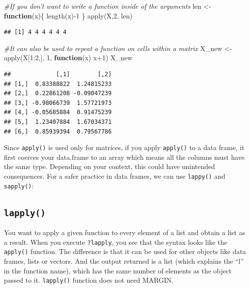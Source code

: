 \documentclass[
]{book}
\newenvironment{Shaded}{\begin{snugshade}}{\end{snugshade}}
\newcommand{\CommentTok}[1]{\textcolor[rgb]{0.56,0.35,0.01}{\textit{#1}}}
\newcommand{\ControlFlowTok}[1]{\textcolor[rgb]{0.13,0.29,0.53}{\textbf{#1}}}
\newcommand{\DecValTok}[1]{\textcolor[rgb]{0.00,0.00,0.81}{#1}}
\newcommand{\FunctionTok}[1]{\textcolor[rgb]{0.00,0.00,0.00}{#1}}
\newcommand{\NormalTok}[1]{#1}
\newcommand{\OtherTok}[1]{\textcolor[rgb]{0.56,0.35,0.01}{#1}}
\newcommand{\SpecialCharTok}[1]{\textcolor[rgb]{0.00,0.00,0.00}{#1}}
\theoremstyle{definition}
\theoremstyle{definition}
\theoremstyle{definition}
\theoremstyle{definition}
\theoremstyle{remark}
\begin{document}
\begin{Shaded}
\begin{Highlighting}[]
\CommentTok{\#If you don’t want to write a function inside of the arguments}
\NormalTok{len }\OtherTok{\textless{}{-}} \ControlFlowTok{function}\NormalTok{(x)\{}
  \FunctionTok{length}\NormalTok{(x)}\SpecialCharTok{{-}}\DecValTok{1}
\NormalTok{\}}
\FunctionTok{apply}\NormalTok{(X,}\DecValTok{2}\NormalTok{, len)}
\end{Highlighting}
\end{Shaded}

\begin{verbatim}
## [1] 4 4 4 4 4 4
\end{verbatim}

\begin{Shaded}
\begin{Highlighting}[]
\CommentTok{\#It can also be used to repeat a function on cells within a matrix}
\NormalTok{X\_new }\OtherTok{\textless{}{-}} \FunctionTok{apply}\NormalTok{(X[}\DecValTok{1}\SpecialCharTok{:}\DecValTok{2}\NormalTok{,], }\DecValTok{1}\NormalTok{, }\ControlFlowTok{function}\NormalTok{(x) x}\SpecialCharTok{+}\DecValTok{1}\NormalTok{)}
\NormalTok{X\_new}
\end{Highlighting}
\end{Shaded}

\begin{verbatim}
##             [,1]        [,2]
## [1,]  0.83388822  1.24815233
## [2,]  0.22861208 -0.09047239
## [3,] -0.98066739  1.57721973
## [4,] -0.05685884  0.91475239
## [5,]  1.23407884  1.67034371
## [6,]  0.85939394  0.79567786
\end{verbatim}

Since \texttt{apply()} is used only for matrices, if you apply \texttt{apply()} to a data frame, it first coerces your data.frame to an array which means all the columns must have the same type. Depending on your context, this could have unintended consequences. For a safer practice in data frames, we can use \texttt{lappy()} and \texttt{sapply()}:

\hypertarget{lapply}{%
\subsection{\texorpdfstring{\texttt{lapply()}}{lapply()}}\label{lapply}}

You want to apply a given function to every element of a list and obtain a list as a result. When you execute \texttt{?lapply}, you see that the syntax looks like the \texttt{apply()} function. The difference is that it can be used for other objects like data frames, lists or vectors. And the output returned is a list (which explains the ``l'' in the function name), which has the same number of elements as the object passed to it. \texttt{lapply()} function does not need MARGIN.
\end{document}
